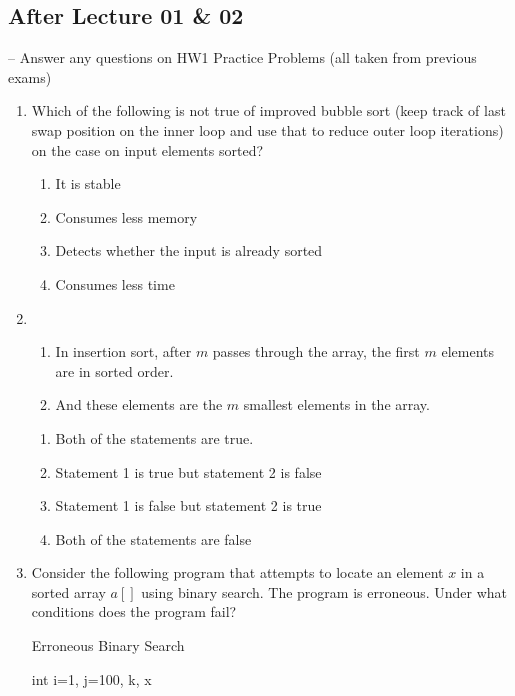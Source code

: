 \documentclass[12pt]{report}
\begin{document}
\subsection{After Lecture 01 \& 02} -- Answer any questions on HW1
Practice Problems (all taken from previous exams)
\begin{enumerate}[label=\arabic*.]
    \item Which of the following is not true of improved bubble sort (keep track of last swap position on the inner loop and use that to reduce outer loop iterations) on the case on input elements sorted?
	\begin{enumerate}[label=\alph*)]
	    \item It is stable
		\item Consumes less memory
		\item Detects whether the input is already sorted
		\item Consumes less time
	\end{enumerate}
	\item~
	\begin{enumerate}[label=Statement \arabic*:]
	    \item In insertion sort, after $m$ passes through the array, the first $m$ elements are in sorted order.
			  \item And these elements are the $m$ smallest elements in the array.
	\end{enumerate}
	\begin{enumerate}[label=\alph*)]
	    \item Both of the statements are true.
		\item Statement 1 is true but statement 2 is false
		\item Statement 1 is false but statement 2 is true
		\item Both of the statements are false
	\end{enumerate}
	\item Consider the following program that attempts to locate an element $x$ in a sorted array $a[]$ using binary search. The program is erroneous. Under what conditions does the program fail?
\begin{algorithm}[H]
		\caption{Erroneous Binary Search}\label{alg:}
		\begin{algorithmic}[1]
			\State int i=1, j=100, k, x
		\EndFunction
		\end{algorithmic}
	\end{algorithm}%

\end{enumerate}
\end{document}
